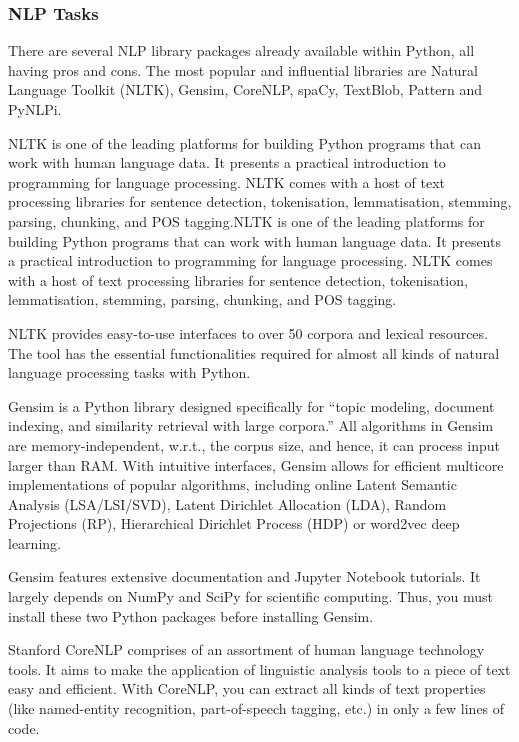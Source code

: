 	\subsubsection{NLP Tasks}
	There are several NLP library packages already available within Python, all having pros and cons. The most popular and influential libraries are Natural Language Toolkit (NLTK), Gensim, CoreNLP, spaCy, TextBlob, Pattern and PyNLPi.
	
	NLTK is one of the leading platforms for building Python programs that can work with human language data. It presents a practical introduction to programming for language processing. NLTK comes with a host of text processing libraries for sentence detection, tokenisation, lemmatisation, stemming, parsing, chunking, and POS tagging.NLTK is one of the leading platforms for building Python programs that can work with human language data. It presents a practical introduction to programming for language processing. NLTK comes with a host of text processing libraries for sentence detection, tokenisation, lemmatisation, stemming, parsing, chunking, and POS tagging.
	
	NLTK provides easy-to-use interfaces to over 50 corpora and lexical resources. The tool has the essential functionalities required for almost all kinds of natural language processing tasks with Python.
	
	Gensim is a Python library designed specifically for “topic modeling, document indexing, and similarity retrieval with large corpora.” All algorithms in Gensim are memory-independent, w.r.t., the corpus size, and hence, it can process input larger than RAM. With intuitive interfaces, Gensim allows for efficient multicore implementations of popular algorithms, including online Latent Semantic Analysis (LSA/LSI/SVD), Latent Dirichlet Allocation (LDA), Random Projections (RP), Hierarchical Dirichlet Process (HDP) or word2vec deep learning. 
	
	Gensim features extensive documentation and Jupyter Notebook tutorials. It largely depends on NumPy and SciPy for scientific computing. Thus, you must install these two Python packages before installing 
	Gensim.
	
	Stanford CoreNLP comprises of an assortment of human language technology tools. It aims to make the application of linguistic analysis tools to a piece of text easy and efficient. With CoreNLP, you can extract all kinds of text properties (like named-entity recognition, part-of-speech tagging, etc.) in only a few lines of code. 
	
